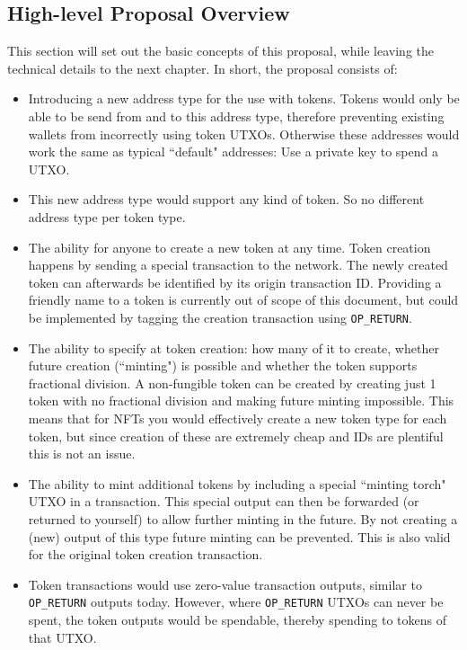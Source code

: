 \documentclass{article}
\begin{document}
\subsection{High-level Proposal Overview}

This section will set out the basic concepts of this proposal, while leaving the technical details to the next chapter.
In short, the proposal consists of:

\begin{itemize}
    \item Introducing a new address type for the use with tokens. Tokens would only be able to be send from and to this address type, therefore preventing existing wallets from incorrectly using token UTXOs. Otherwise these addresses would work the same as typical ``default" addresses: Use a private key to spend a UTXO.
    \item This new address type would support any kind of token. So no different address type per token type.
    \item The ability for anyone to create a new token at any time. Token creation happens by sending a special transaction to the network. The newly created token can afterwards be identified by its origin transaction ID. Providing a friendly name to a token is currently out of scope of this document, but could be implemented by tagging the creation transaction using \texttt{OP\_RETURN}.
    \item The ability to specify at token creation: how many of it to create, whether future creation (``minting") is possible and whether the token supports fractional division. A non-fungible token can be created by creating just 1 token with no fractional division and making future minting impossible. This means that for NFTs you would effectively create a new token type for each token, but since creation of these are extremely cheap and IDs are plentiful this is not an issue.
    \item The ability to mint additional tokens by including a special ``minting torch" UTXO in a transaction. This special output can then be forwarded (or returned to yourself) to allow further minting in the future. By not creating a (new) output of this type future minting can be prevented. This is also valid for the original token creation transaction.
    \item Token transactions would use zero-value transaction outputs, similar to \texttt{OP\_RETURN} outputs today. However, where \texttt{OP\_RETURN} UTXOs can never be spent, the token outputs would be spendable, thereby spending to tokens of that UTXO.

\end{itemize}
\end{document}
